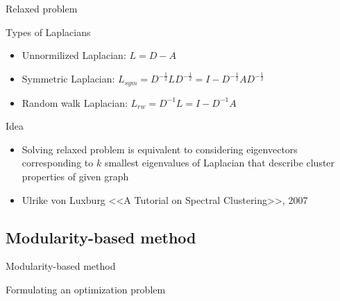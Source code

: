 \documentclass{beamer}
\theoremstyle{definition}
\theoremstyle{plain}
\theoremstyle{remark}
\begin{document}
\begin{frame}{Relaxed problem}

\begin{block}{Types of Laplacians}

\begin{itemize}

\item Unnormilized Laplacian: $L=D-A$

\item Symmetric Laplacian: $L_{sym} =D^{-\frac{1}{2}}LD^{-\frac{1}{2}}=I-D^{-\frac{1}{2}}AD^{-\frac{1}{2}}$

\item Random walk Laplacian: $L_{rw} =D^{-1}L=I-D^{-1}A$

\end{itemize}

\end{block}

\begin{block}{Idea}

\begin{itemize}

\item Solving relaxed problem is equivalent to considering eigenvectors corresponding to $k$ smallest eigenvalues of Laplacian that describe cluster properties of given graph

\end{itemize}

\end{block}

\begin{block}

\begin{itemize}
\item Ulrike von Luxburg <<A Tutorial on Spectral Clustering>>, 2007

\end{itemize}

\end{block}

\end{frame}

		\subsection{Modularity-based method}
			\begin{frame}{Modularity-based method}
				\begin{block}{Formulating an optimization problem}
				\end{block}
			\end{frame}
\end{document}
